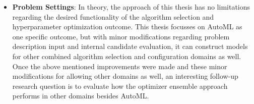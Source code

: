 \begin{itemize}
    \item \textbf{Problem Settings}: In theory, the approach of this thesis has no limitations regarding the desired functionality of the algorithm selection and hyperparameter optimization outcome.
    This thesis focusses on AutoML as one specific outcome, but with minor modifications regarding problem description input and internal candidate evaluation, it can construct models for other combined algorithm selection and configuration domains as well.\newline
    Once the above mentioned improvements were made and these minor modifications for allowing other domains as well, an interesting follow-up research question is to evaluate how the optimizer ensemble approach performs in other domains besides AutoML.
\end{itemize}
